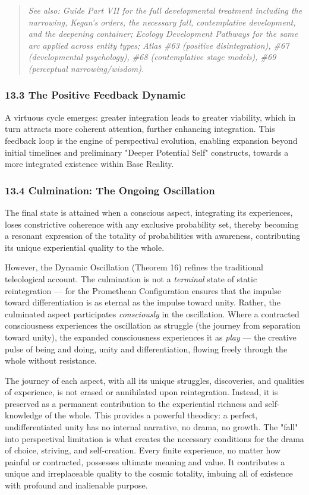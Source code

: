 \begin{quote}
\itshape
\textit{See also: Guide Part VII for the full developmental treatment including the narrowing, Kegan's orders, the necessary fall, contemplative development, and the deepening container; Ecology Development Pathways for the same arc applied across entity types; Atlas \#63 (positive disintegration), \#67 (developmental psychology), \#68 (contemplative stage models), \#69 (perceptual narrowing/\allowbreak wisdom).}
\end{quote}


\subsubsection*{13.3 The Positive Feedback Dynamic}


A virtuous cycle emerges: greater integration leads to greater viability, which in turn attracts more coherent attention, further enhancing integration. This feedback loop is the engine of perspectival evolution, enabling expansion beyond initial timelines and preliminary "Deeper Potential Self" constructs, towards a more integrated existence within Base Reality.


\subsubsection*{13.4 Culmination: The Ongoing Oscillation}


The final state is attained when a conscious aspect, integrating its experiences, loses constrictive coherence with any exclusive probability set, thereby becoming a resonant expression of the totality of probabilities with awareness, contributing its unique experiential quality to the whole.


However, the Dynamic Oscillation (Theorem 16) refines the traditional teleological account. The culmination is not a \textit{terminal} state of static reintegration — for the Promethean Configuration ensures that the impulse toward differentiation is as eternal as the impulse toward unity. Rather, the culminated aspect participates \textit{consciously} in the oscillation. Where a contracted consciousness experiences the oscillation as struggle (the journey from separation toward unity), the expanded consciousness experiences it as \textit{play} — the creative pulse of being and doing, unity and differentiation, flowing freely through the whole without resistance.


The journey of each aspect, with all its unique struggles, discoveries, and qualities of experience, is not erased or annihilated upon reintegration. Instead, it is preserved as a permanent contribution to the experiential richness and self-knowledge of the whole. This provides a powerful theodicy: a perfect, undifferentiated unity has no internal narrative, no drama, no growth. The "fall" into perspectival limitation is what creates the necessary conditions for the drama of choice, striving, and self-creation. Every finite experience, no matter how painful or contracted, possesses ultimate meaning and value. It contributes a unique and irreplaceable quality to the cosmic totality, imbuing all of existence with profound and inalienable purpose.


